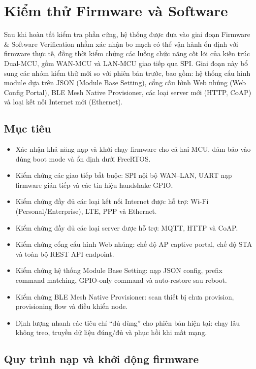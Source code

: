 \section{Kiểm thử Firmware và Software}

Sau khi hoàn tất kiểm tra phần cứng, hệ thống được đưa vào giai đoạn Firmware \& Software Verification nhằm xác nhận bo mạch có thể vận hành ổn định với firmware thực tế, đồng thời kiểm chứng các luồng chức năng cốt lõi của kiến trúc Dual-MCU, gồm WAN-MCU và LAN-MCU giao tiếp qua SPI. Giai đoạn này bổ sung các nhóm kiểm thử mới so với phiên bản trước, bao gồm: hệ thống cấu hình module dựa trên JSON (Module Base Setting), cổng cấu hình Web nhúng (Web Config Portal), BLE Mesh Native Provisioner, các loại server mới (HTTP, CoAP) và loại kết nối Internet mới (Ethernet).

    \subsection{Mục tiêu}

        \begin{itemize}
            \item Xác nhận khả năng nạp và khởi chạy firmware cho cả hai MCU, đảm bảo vào đúng boot mode và ổn định dưới FreeRTOS.
            \item Kiểm chứng các giao tiếp bắt buộc: SPI nội bộ WAN--LAN, UART nạp firmware gián tiếp và các tín hiệu handshake GPIO.
            \item Kiểm chứng đầy đủ các loại kết nối Internet được hỗ trợ: Wi-Fi (Personal/Enterprise), LTE, PPP và Ethernet.
            \item Kiểm chứng đầy đủ các loại server được hỗ trợ: MQTT, HTTP và CoAP.
            \item Kiểm chứng cổng cấu hình Web nhúng: chế độ AP captive portal, chế độ STA và toàn bộ REST API endpoint.
            \item Kiểm chứng hệ thống Module Base Setting: nạp JSON config, prefix command matching, GPIO-only command và auto-restore sau reboot.
            \item Kiểm chứng BLE Mesh Native Provisioner: scan thiết bị chưa provision, provisioning flow và điều khiển node.
            \item Định lượng nhanh các tiêu chí ``đủ dùng'' cho phiên bản hiện tại: chạy lâu không treo, truyền dữ liệu đúng/đủ và phục hồi khi mất mạng.
        \end{itemize}

    \subsection{Quy trình nạp và khởi động firmware}

